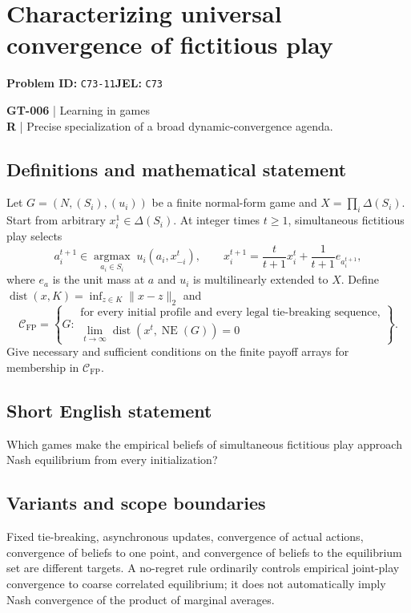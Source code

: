 \documentclass[11pt,a4paper]{article}
\begin{document}
\section*{Characterizing universal convergence of fictitious play}
\textbf{Problem ID:} \texttt{C73-11}\quad \textbf{JEL:} \texttt{C73}\par
\label{problem:OP-0136}
\label{game:GT-006}
{\sffamily\small\color{muted}
\textbf{GT-006} | Learning in games\\
\textbf{R} | Precise specialization of a broad dynamic-convergence agenda.
\par}
\subsection*{Definitions and mathematical statement}
Let $G=(N,(S_i),(u_i))$ be a finite normal-form game and $X=\prod_i\Delta(S_i)$. Start from arbitrary $x_i^1\in\Delta(S_i)$. At integer times $t\geq1$, simultaneous fictitious play selects
\[
 a_i^{t+1}\in\underset{a_i\in S_i}{\operatorname{argmax}}\;
 u_i(a_i,x_{-i}^{t}),\qquad
 x_i^{t+1}=\frac{t}{t+1}x_i^t+\frac1{t+1}e_{a_i^{t+1}},
\]
where $e_a$ is the unit mass at $a$ and $u_i$ is multilinearly extended to $X$. Define $\operatorname{dist}(x,K)=\inf_{z\in K}\|x-z\|_2$ and
\[
 \mathcal C_{\mathrm{FP}}=\left\{G:
 \begin{array}{l}
 \text{for every initial profile and every legal tie-breaking sequence,}\\
 \displaystyle\lim_{t\to\infty}\operatorname{dist}(x^t,\operatorname{NE}(G))=0
 \end{array}\right\}.
\]
Give necessary and sufficient conditions on the finite payoff arrays for membership in $\mathcal C_{\mathrm{FP}}$.
\subsection*{Short English statement}
Which games make the empirical beliefs of simultaneous fictitious play approach Nash equilibrium from every initialization?
\subsection*{Variants and scope boundaries}
Fixed tie-breaking, asynchronous updates, convergence of actual actions, convergence of beliefs to one point, and convergence of beliefs to the equilibrium set are different targets. A no-regret rule ordinarily controls empirical joint-play convergence to coarse correlated equilibrium; it does not automatically imply Nash convergence of the product of marginal averages.
\end{document}
